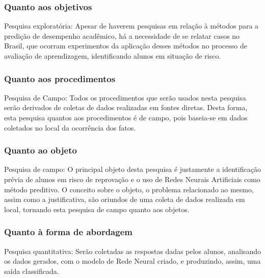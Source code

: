 \documentclass[
	12pt,				%
	openright,			%
	oneside,
	a4paper,			%
	english,			%
	french,				%
	spanish,			%
	brazil,				%
	]{abntex2}
\begin{document}
\subsubsection{Quanto aos objetivos}
Pesquisa exploratória: Apesar de haverem pesquisas em relação à métodos para a predição de desempenho acadêmico, há a necessidade de se relatar casos no Brasil, que ocorram experimentos da aplicação desses métodos no processo de avaliação de aprendizagem, identificando alunos em situação de risco.

\subsubsection{Quanto aos procedimentos}
Pesquisa de Campo: Todos os procedimentos que serão usados nesta pesquisa serão derivados de coletas de dados realizadas em fontes diretas. Desta forma, esta pesquisa quantos aos procedimentos é de campo, pois baseia-se em dados coletados no local da ocorrência dos fatos.

\subsubsection{Quanto ao objeto}
Pesquisa de campo: O principal objeto desta pesquisa é justamente a identificação prévia de alunos em risco de reprovação e o uso de Redes Neurais Artificiais como método preditivo. O conceito sobre o objeto, o problema relacionado ao mesmo, assim como a justificativa, são oriundos de uma coleta de dados realizada em local, tornando esta pesquisa de campo quanto aos objetos.

\subsubsection{Quanto à forma de abordagem}
Pesquisa quantitativa: Serão coletadas as respostas dadas pelos alunos, analisando os dados gerados, com o modelo de Rede Neural criado, e produzindo, assim, uma saída classificada.
\end{document}
